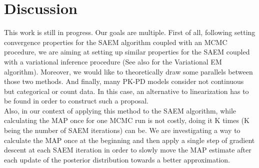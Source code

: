 \documentclass{article}
\begin{document}
\section{Discussion} 
This work is still in progress. Our goals are multiple. First of all, following \citep{kuhn} setting convergence properties for the SAEM algorithm coupled with an MCMC procedure, we are aiming at setting up similar properties for the SAEM coupled with a variational inference procedure (See also \citep{gunawardana} for the Variational EM algorithm). Moreover, we would like to theoretically draw some parallels between those two methods. And finally, many PK-PD models consider not continuous but categorical or count data. In this case, an alternative to linearization has to be found in order to construct such a proposal.\\
Also, in our context of applying this method to the SAEM algorithm, while calculating the MAP once for one MCMC run is not costly, doing it K times (K being the number of SAEM iterations) can be. We are investigating a way to calculate the MAP once at the beginning and then apply a single step of gradient descent at each SAEM iteration in order to slowly move the MAP estimate after each update of the posterior distribution towards a better approximation.



\end{document}
